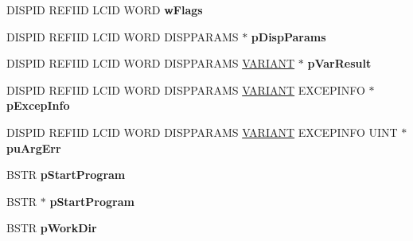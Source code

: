 \begin{DoxyCompactItemize}
D\+I\+S\+P\+ID R\+E\+F\+I\+ID L\+C\+ID W\+O\+RD {\bfseries w\+Flags}
\item 
\mbox{\label{struct_i_ms_rdp_client_secured_settings_vtbl_a8a6c83ffa481d37914c7a1ccb6bd5c9e}} 
D\+I\+S\+P\+ID R\+E\+F\+I\+ID L\+C\+ID W\+O\+RD D\+I\+S\+P\+P\+A\+R\+A\+MS $\ast$ {\bfseries p\+Disp\+Params}
\item 
\mbox{\label{struct_i_ms_rdp_client_secured_settings_vtbl_aa3126f3950af6a8496cd577dd5021529}} 
D\+I\+S\+P\+ID R\+E\+F\+I\+ID L\+C\+ID W\+O\+RD D\+I\+S\+P\+P\+A\+R\+A\+MS \hyperlink{structtag_v_a_r_i_a_n_t}{V\+A\+R\+I\+A\+NT} $\ast$ {\bfseries p\+Var\+Result}
\item 
\mbox{\label{struct_i_ms_rdp_client_secured_settings_vtbl_a285470c4d6fc46553ea5375b8b8af184}} 
D\+I\+S\+P\+ID R\+E\+F\+I\+ID L\+C\+ID W\+O\+RD D\+I\+S\+P\+P\+A\+R\+A\+MS \hyperlink{structtag_v_a_r_i_a_n_t}{V\+A\+R\+I\+A\+NT} E\+X\+C\+E\+P\+I\+N\+FO $\ast$ {\bfseries p\+Excep\+Info}
\item 
\mbox{\label{struct_i_ms_rdp_client_secured_settings_vtbl_a02b6b0228004c7eab7af4cd75e0e898e}} 
D\+I\+S\+P\+ID R\+E\+F\+I\+ID L\+C\+ID W\+O\+RD D\+I\+S\+P\+P\+A\+R\+A\+MS \hyperlink{structtag_v_a_r_i_a_n_t}{V\+A\+R\+I\+A\+NT} E\+X\+C\+E\+P\+I\+N\+FO U\+I\+NT $\ast$ {\bfseries pu\+Arg\+Err}
\item 
\mbox{\label{struct_i_ms_rdp_client_secured_settings_vtbl_a359fe003d97ebbf7f26b86b08689efaf}} 
B\+S\+TR {\bfseries p\+Start\+Program}
\item 
\mbox{\label{struct_i_ms_rdp_client_secured_settings_vtbl_a2c8b8434e1c713e5bead83e80428b970}} 
B\+S\+TR $\ast$ {\bfseries p\+Start\+Program}
\item 
\mbox{\label{struct_i_ms_rdp_client_secured_settings_vtbl_a34ec829a5ba3e2616c2856b27f8e99ec}} 
B\+S\+TR {\bfseries p\+Work\+Dir}
\item 
\mbox{\label{struct_i_ms_rdp_client_secured_settings_vtbl_a916d2ad4e3f8498dc3228e2ce032362f}} 

\end{DoxyCompactItemize}
